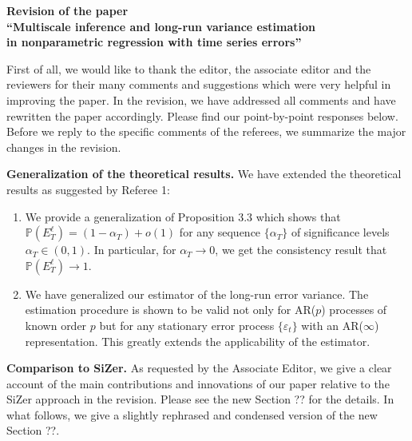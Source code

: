 \documentclass[a4paper,12pt]{article}
\begin{document}
\begin{center} 
{\large \bf Revision of the paper} \\[0.1cm]
{\large \bf ``Multiscale inference and long-run variance estimation} \\[0.1cm]
{\large \bf in nonparametric regression with time series errors''} 
\end{center}
\vspace{7pt}



First of all, we would like to thank the editor, the associate editor and the reviewers for their many comments and suggestions which were very helpful in improving the paper. In the revision, we have addressed all comments and have rewritten the paper accordingly. Please find our point-by-point responses below. 
Before we reply to the specific comments of the referees, we summarize the major changes in the revision.
\vspace{10pt}


\textbf{Generalization of the theoretical results.} We have extended the theoretical results as suggested by Referee 1:
\begin{enumerate}[label=(\roman*), leftmargin=0.8cm]

\item We provide a generalization of Proposition 3.3 which shows that $\mathbb{P}({E}_T^{\ell}) = (1 - \alpha_T) + o(1)$ for any sequence $\{\alpha_T\}$ of significance levels $\alpha_T \in (0,1)$. In particular, for $\alpha_T \rightarrow 0$, we get the consistency result that $\mathbb{P}({E}_T^{\ell}) \rightarrow 1$. 

\item We have generalized our estimator of the long-run error variance. The estimation procedure is shown to be valid not only for AR($p$) processes of known order $p$ but for any stationary error process $\{\varepsilon_t\}$ with an AR($\infty$) representation. This greatly extends the applicability of the estimator. 
\end{enumerate}
\vspace{3pt}


\textbf{Comparison to SiZer.} As requested by the Associate Editor, we give a clear account of the main contributions and innovations of our paper relative to the SiZer approach in the revision. Please see the new Section ?? for the details. In what follows, we give a slightly rephrased and condensed version of the new Section ??. 
\end{document}
